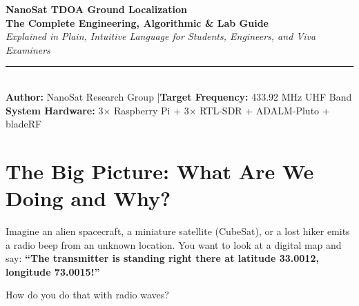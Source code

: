 \documentclass[11pt,a4paper]{article}
\begin{document}
\begin{center}
    {\Huge \bfseries \color{primaryblue} NanoSat TDOA Ground Localization}\\[0.3cm]
    {\Large \bfseries \color{secondaryblue} The Complete Engineering, Algorithmic \& Lab Guide}\\[0.2cm]
    {\normalsize \textit{Explained in Plain, Intuitive Language for Students, Engineers, and Viva Examiners}}\\[0.4cm]
    \rule{0.8\textwidth}{1pt}\\[0.3cm]
    \textbf{Author:} NanoSat Research Group \quad|\quad \textbf{Target Frequency:} 433.92 MHz UHF Band\\[0.1cm]
    \textbf{System Hardware:} 3$\times$ Raspberry Pi + 3$\times$ RTL-SDR + ADALM-Pluto + bladeRF
\end{center}
\vspace{0.3cm}

\begin{abstract}
\noindent This document explains the complete \textbf{NanoSat Time Difference of Arrival (TDOA)} localization system from first principles. It is written so that anyone---from a high school student to a senior university examiner---can understand how multiple low-cost ground stations can pinpoint a mystery radio transmitter on a map without needing expensive atomic clocks or GPS synchronization. It details the radio frequency (RF) physics, the digital signal processing (DSP) algorithms, the mathematics of hyperbolic multilateration, the web-based tactical radar dashboard, and provides a step-by-step laboratory checklist for hardware execution.
\end{abstract}

\tableofcontents
\newpage

\section{The Big Picture: What Are We Doing and Why?}

Imagine an alien spacecraft, a miniature satellite (CubeSat), or a lost hiker emits a radio beep from an unknown location. You want to look at a digital map and say: \textbf{``The transmitter is standing right there at latitude 33.0012, longitude 73.0015!''}

How do you do that with radio waves?
\end{document}
